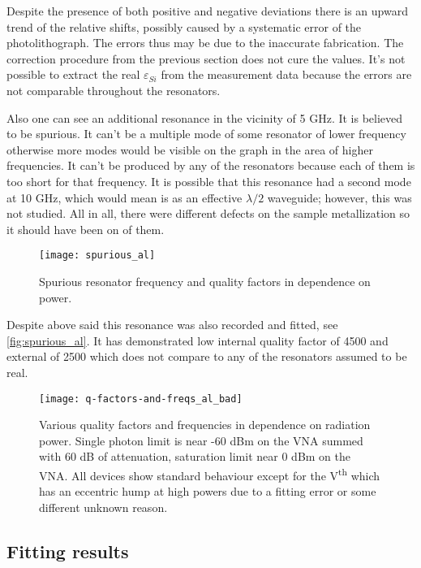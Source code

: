 \documentclass[12pt]{article}
\numberwithin{equation}{section}
\numberwithin{figure}{section}
\begin{document}
Despite the presence of both positive and negative deviations there is an upward trend of the relative shifts, possibly caused by a systematic error of the photolithograph. The errors thus may be due to the inaccurate fabrication. The correction procedure from the previous section does not cure the values. It's not possible to extract the real $\varepsilon_{Si}$ from the measurement data because the errors are not comparable throughout the resonators.

Also one can see an additional resonance in the vicinity of 5 GHz. It is believed to be spurious. It can't be a multiple mode of some resonator of lower frequency otherwise more modes would be visible on the graph in the area of higher frequencies. It can't be produced by any of the resonators because each of them is too short for that frequency. It is possible that this resonance had a second mode at 10 GHz, which would mean is as an effective $\lambda/2$ waveguide; however, this was not studied. All in all, there were different defects on the sample metallization so it should have been on of them.

\begin{figure}
\centering
\texttt{[image: spurious\_al]}
\caption{Spurious resonator frequency and quality factors in dependence on power.}
\label{fig:spurious_al}
\end{figure}

Despite above said this resonance was also recorded and fitted, see \autoref{fig:spurious_al}. It has demonstrated low internal quality factor of 4500 and external of 2500 which does not compare to any of the resonators assumed to be real.

\begin{figure}
\hspace{-0.7cm}
\texttt{[image: q-factors-and-freqs\_al\_bad]}
\caption{Various quality factors and frequencies in dependence on radiation power. Single photon limit is near -60 dBm on the VNA summed with 60 dB of attenuation, saturation limit near 0 dBm on the VNA. All devices show standard behaviour except for the V\textsuperscript{th} which has an eccentric hump at high powers due to a fitting error or some different unknown reason.}
\label{fig:q_factors_al}
\end{figure}

\subsection{Fitting results}
\end{document}
